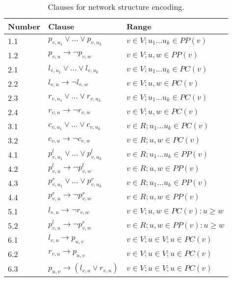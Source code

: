 \documentclass[runningheads, envcountsame, a4paper]{llncs}
\begin{document}
\begin{table}[t]
\centering
\caption{Clauses for network structure encoding.}
\begin{tabular}{l | l | l}
  Number & Clause & Range \\
  
  \hline
  1.1 &
  $p_{v,u_1} \vee \dots \vee p_{v,u_k}$ &
  $v \in V; u_1 \dots u_k \in PP(v)$
  \\
  1.2 &
  $p_{v,u} \rightarrow \neg p_{v,w}$ &
  $v \in V; u, w \in PP(v)$
  \\
  
  \hline
  2.1 &
  $l_{v,u_1} \vee \dots \vee l_{v,u_k}$ &
  $v \in V; u_1 \dots u_k \in PC(v)$
  \\
  2.2 &
  $l_{v,u} \rightarrow \neg l_{v,w}$ &
  $v \in V; u, w \in PC(v)$
  \\
  2.3 &
  $r_{v,u_1} \vee \dots \vee r_{v,u_k}$ &
  $v \in V; u_1 \dots u_k \in PC(v)$
  \\
  2.4 &
  $r_{v,u} \rightarrow \neg r_{v,w}$ &
  $v \in V; u, w \in PC(v)$
  \\
  
  \hline
  3.1 &
  $c_{v,u_1} \vee \dots \vee c_{v,u_k}$ &
  $v \in R; u_1 \dots u_k \in PC(v)$
  \\
  3.2 &
  $c_{v,u} \rightarrow \neg c_{v,w}$ &
  $v \in R; u, w \in PC(v)$
  \\
  
  \hline
  4.1 &
  $p^l_{v,u_1} \vee \dots \vee p^l_{v,u_k}$ &
  $v \in R; u_1 \dots u_k \in PP(v)$
  \\
  4.2 &
  $p^l_{v,u} \rightarrow \neg p^l_{v,w}$ &
  $v \in R; u, w \in PP(v)$
  \\
  4.3 &
  $p^r_{v,u_1} \vee \dots \vee p^r_{v,u_k}$ &
  $v \in R; u_1 \dots u_k \in PP(v)$
  \\
  4.4 &
  $p^r_{v,u} \rightarrow \neg p^r_{v,w}$ &
  $v \in R; u, w \in PP(v)$
  \\

  \hline
  5.1 &
  $l_{v,u} \rightarrow \neg r_{v,w}$ &
  $v \in V; u, w \in PC(v): u \geq w$
  \\
  5.2 &
  $p^l_{v,u} \rightarrow \neg p^r_{v,w}$ &
  $v \in R; u, w \in PP(v) : u \geq w$
  \\
  
  \hline
  6.1 &
  $l_{v,u} \rightarrow p_{u,v}$ &
  $v \in V; u \in V; u \in PC(v)$
  \\
  6.2 &
  $r_{v,u} \rightarrow p_{u,v}$ &
  $v \in V; u \in V; u \in PC(v)$
  \\
  6.3 &
  $p_{u,v} \rightarrow (l_{v,u} \vee r_{v,u})$ &
  $v \in V; u \in V; u \in PC(v)$
  \\
  

\end{tabular}
\end{table}
\end{document}
